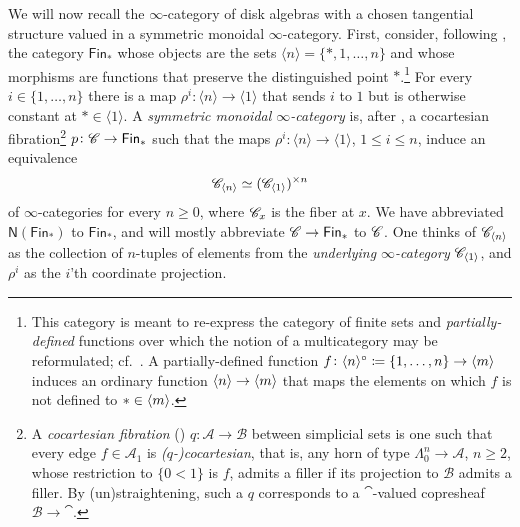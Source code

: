 \documentclass[../text]{subfiles}
\begin{document}
We will now recall the $\infty$-category of disk algebras with a chosen tangential structure valued in a symmetric monoidal $\infty$-category. First, consider, following \cite{lurie_ha}, the category $\mathsf{Fin}_\ast$ whose objects are the sets $\langle n\rangle=\{\ast,1,\dots,n\}$ and whose morphisms are functions that preserve the distinguished point $\ast$.\footnote{\label{YNAXOHZ}This category is meant to re-express the category of finite sets and \emph{partially-defined} functions over which the notion of a multicategory may be reformulated; cf.\ \cite[Construction 2.1.1.7]{lurie_ha}. A partially-defined function $f\colon\langle n \rangle^\circ\coloneqq\{1,\dots,n\}\to\langle m \rangle$ induces an ordinary function $\langle n \rangle\to\langle m \rangle$ that maps the elements on which $f$ is not defined to $\ast\in\langle m \rangle$.} For every $i\in\{1,\dots,n\}$ there is a map $\rho^i\colon\langle n\rangle\to\langle 1\rangle$ that sends $i$ to $1$ but is otherwise constant at $\ast\in\langle1\rangle$. A \emph{symmetric monoidal $\infty$-category} is, after \cite[Definition 2.0.0.7]{lurie_ha}, a cocartesian fibration\footnote{A \emph{cocartesian fibration} (\cite[Definition 01T5]{lurie_kerodon}) $q\colon\mathscr{A}\to\mathscr{B}$ between simplicial sets is one such that every edge $f\in\mathscr{A}_1$ is \emph{($q$-)cocartesian}, that is, any horn of type $\Lambda^n_0\to\mathscr{A}$, $n\geq2$, whose restriction to $\{0<1\}$ is $f$, admits a filler if its projection to $\mathscr{B}$ admits a filler. By (un)straightening, such a $q$ corresponds to a $\cat$-valued copresheaf $\mathscr{B}\to\cat$.} $p\colon\mathscr{C}\to\mathsf{Fin}_\ast$ such that the maps $\rho^i\colon\langle n\rangle\to\langle 1\rangle$, $1\leq i\leq n$, induce an equivalence 
\begin{equation}\label{W1183QD}
\mathscr{C}_{\langle n\rangle}\simeq(\mathscr{C}_{\langle 1\rangle})^{\times n}
\end{equation} 
of $\infty$-categories for every $n\geq0$, where $\mathscr{C}_{x}$ is the fiber at $x$. We have abbreviated $\mathsf{N}(\mathsf{Fin}_\ast)$ to $\mathsf{Fin}_\ast$, and will mostly abbreviate $\mathscr{C}\to\mathsf{Fin}_\ast$ to $\mathscr{C}$. One thinks of $\mathscr{C}_{\langle n\rangle}$ as the collection of $n$-tuples of elements from the \emph{underlying $\infty$-category} $\mathscr{C}_{\langle 1 \rangle}$, and $\rho^i$ as the $i$'th coordinate projection. 
\end{document}
